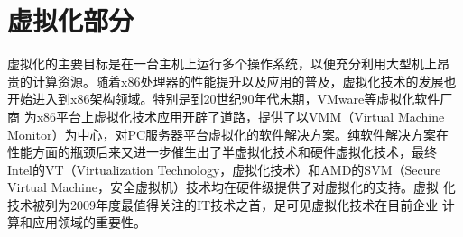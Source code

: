 \part{虚拟化部分}
\label{part:virtualization}

虚拟化的主要目标是在一台主机上运行多个操作系统，以便充分利用大型机上昂
贵的计算资源。随着x86处理器的性能提升以及应用的普及，虚拟化技术的发展也
开始进入到x86架构领域。特别是到20世纪90年代末期，VMware等虚拟化软件厂商
为x86平台上虚拟化技术应用开辟了道路，提供了以VMM（Virtual Machine
  Monitor）为中心，对PC服务器平台虚拟化的软件解决方案。纯软件解决方案在
性能方面的瓶颈后来又进一步催生出了半虚拟化技术和硬件虚拟化技术，最终
Intel的VT（Virtualization Technology，虚拟化技术）和AMD的SVM（Secure
  Virtual Machine，安全虚拟机）技术均在硬件级提供了对虚拟化的支持。虚拟
化技术被列为2009年度最值得关注的IT技术之首，足可见虚拟化技术在目前企业
计算和应用领域的重要性。








